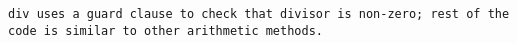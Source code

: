 \tt{div} uses a guard clause to check that divisor is non-zero;
rest of the code is similar to other arithmetic methods.
